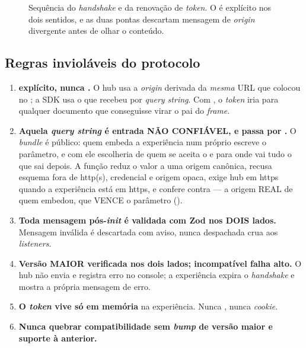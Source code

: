 \begin{figure}[H]
{}
\caption[Sequência do handshake hub-experiência]{Sequência do \emph{handshake} e
  da renovação de \emph{token}. O  é explícito nos dois
  sentidos, e as duas pontas descartam mensagem de \emph{origin} divergente
  antes de olhar o conteúdo.}
\label{fig:seq-handshake}
\end{figure}

\subsection{Regras invioláveis do protocolo}

\begin{regra}
\begin{enumerate}
  \item \textbf{ explícito, nunca .} O hub usa a
    \emph{origin} derivada da \emph{mesma} URL que colocou no ; a SDK
    usa o  que recebeu por \emph{query string}. Com , o
    \emph{token} iria para qualquer documento que conseguisse virar o pai do
    \emph{frame}.
  \item \textbf{Aquela \emph{query string} é entrada NÃO CONFIÁVEL, e passa por
    .} O \emph{bundle} é público: quem embeda a
    experiência num  próprio escreve o parâmetro, e com ele escolheria
    de quem se aceita o  e para onde vai tudo o que sai depois. A
    função reduz o valor a uma origem canônica, recusa esquema fora de http(s),
    credencial e origem opaca, exige hub em https quando a experiência está em
    https, e confere contra  --- a origem REAL de
    quem embedou, que VENCE o parâmetro ().
  \item \textbf{Toda mensagem pós-\emph{init} é validada com Zod nos DOIS
    lados.} Mensagem inválida é descartada com aviso, nunca despachada crua aos
    \emph{listeners}.
  \item \textbf{Versão MAIOR verificada nos dois lados; incompatível falha
    alto.} O hub não envia  e registra erro no console; a
    experiência expira o \emph{handshake} e mostra a própria mensagem de erro.
  \item \textbf{O \emph{token} vive só em memória} na experiência. Nunca
    , nunca \emph{cookie}.
  \item \textbf{Nunca quebrar compatibilidade sem \emph{bump} de versão maior e
    suporte à anterior.}
\end{enumerate}
\end{regra}

